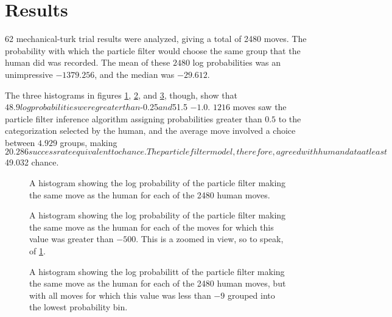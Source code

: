 \section*{Results}
\label{sec:results}

62 mechanical-turk trial results were analyzed, giving a total of 2480 moves.
The probability with which the particle filter would choose the same group that
the human did was recorded. The mean of these $2480$ log probabilities was an
unimpressive $-1379.256$, and the median was $-29.612$.

The three histograms in figures \ref{fig:fullhist}, \ref{fig:smallhist}, and
\ref{fig:cumulativehist}, though, show that $48.9%
log probabilities were greater than $-0.25$ and $51.5%
$-1.0$. $1216$ moves saw the particle filter inference algorithm assigning
probabilities greater than $0.5$ to the categorization selected by the human,
and the average move involved a choice between $4.929$ groups, making $20.286%
success rate equivalent to chance. The particle filter model, therefore, agreed
with human data at least $49.032%
chance.

\begin{figure}
\centering
{}
\label{fig:fullhist}
\caption{A histogram showing the log probability of the particle filter making
the same move as the human for each of the 2480 human moves.}
\end{figure}

\begin{figure}
\centering
{}
\label{fig:smallhist}
\caption{A histogram showing the log probability of the particle filter making
the same move as the human for each of the moves for which this value was
greater than $-500$. This is a zoomed in view, so to speak, of
\ref{fig:fullhist}.}
\end{figure}

\begin{figure}
\centering
{}
\label{fig:cumulativehist}
\caption{A histogram showing the log probabilitt of the particle filter making
the same move as the human for each of the 2480 human moves, but with all moves
for which this value was less than $-9$ grouped into the lowest probability bin.}
\end{figure}

